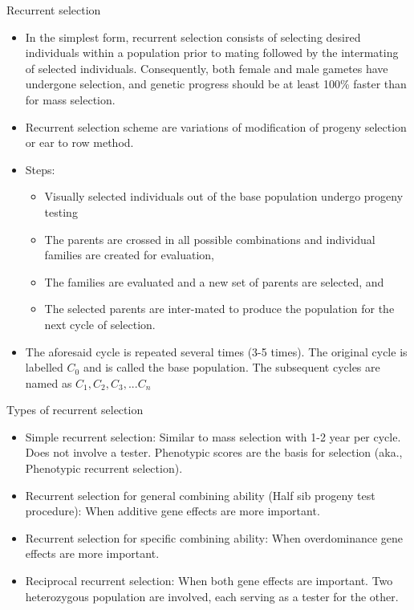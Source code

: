 \documentclass[11pt,ignorenonframetext,aspectratio=169]{beamer}
\providecommand{\tightlist}{%
  \setlength{\itemsep}{0pt}\setlength{\parskip}{0pt}}
\begin{document}
\begin{frame}{Recurrent selection}
\protect\hypertarget{recurrent-selection}{}
\small

\begin{itemize}
\tightlist
\item
  In the simplest form, recurrent selection consists of selecting
  desired individuals within a population prior to mating followed by
  the intermating of selected individuals. Consequently, both female and
  male gametes have undergone selection, and genetic progress should be
  at least 100\% faster than for mass selection.
\item
  Recurrent selection scheme are variations of modification of progeny
  selection or ear to row method.
\item
  Steps:

  \begin{itemize}
  \footnotesize
  \item Visually selected individuals out of the base population undergo progeny testing
  \item The parents are crossed in all possible combinations and individual families are created for evaluation, 
  \item The families are evaluated and a new set of parents are selected, and 
  \item The selected parents are inter-mated to produce the population for the next cycle of selection.
  \end{itemize}
\item
  The aforesaid cycle is repeated several times (3-5 times). The
  original cycle is labelled \(C_0\) and is called the base population.
  The subsequent cycles are named as \(C_1, C_2, C_3, ... C_n\)
\end{itemize}
\end{frame}

\begin{frame}{Types of recurrent selection}
\protect\hypertarget{types-of-recurrent-selection}{}
\begin{itemize}
\tightlist
\item
  Simple recurrent selection: Similar to mass selection with 1-2 year
  per cycle. Does not involve a tester. Phenotypic scores are the basis
  for selection (aka., Phenotypic recurrent selection).
\item
  Recurrent selection for general combining ability (Half sib progeny
  test procedure): When additive gene effects are more important.
\item
  Recurrent selection for specific combining ability: When overdominance
  gene effects are more important.
\item
  Reciprocal recurrent selection: When both gene effects are important.
  Two heterozygous population are involved, each serving as a tester for
  the other.
\end{itemize}
\end{frame}
\end{document}
